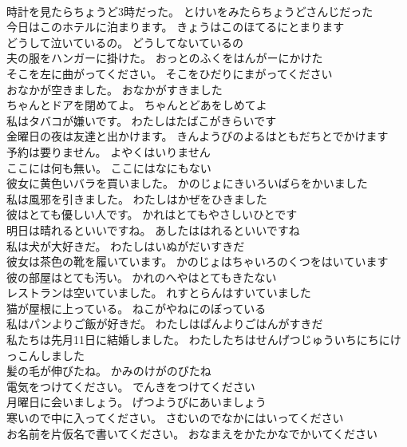 \documentclass[8pt]{extreport}
\begin{document}
\begin{CJK}{UTF8}{min}
\\	時計を見たらちょうど3時だった。	とけいをみたらちょうどさんじだった 
\\	今日はこのホテルに泊まります。	きょうはこのほてるにとまります 
\\	どうして泣いているの。	どうしてないているの 
\\	夫の服をハンガーに掛けた。	おっとのふくをはんがーにかけた 
\\	そこを左に曲がってください。	そこをひだりにまがってください 
\\	おなかが空きました。	おなかがすきました 
\\	ちゃんとドアを閉めてよ。	ちゃんとどあをしめてよ 
\\	私はタバコが嫌いです。	わたしはたばこがきらいです 
\\	金曜日の夜は友達と出かけます。	きんようびのよるはともだちとでかけます 
\\	予約は要りません。	よやくはいりません 
\\	ここには何も無い。	ここにはなにもない 
\\	彼女に黄色いバラを買いました。	かのじょにきいろいばらをかいました 
\\	私は風邪を引きました。	わたしはかぜをひきました 
\\	彼はとても優しい人です。	かれはとてもやさしいひとです 
\\	明日は晴れるといいですね。	あしたははれるといいですね 
\\	私は犬が大好きだ。	わたしはいぬがだいすきだ 
\\	彼女は茶色の靴を履いています。	かのじょはちゃいろのくつをはいています 
\\	彼の部屋はとても汚い。	かれのへやはとてもきたない 
\\	レストランは空いていました。	れすとらんはすいていました 
\\	猫が屋根に上っている。	ねこがやねにのぼっている 
\\	私はパンよりご飯が好きだ。	わたしはぱんよりごはんがすきだ 
\\	私たちは先月11日に結婚しました。	わたしたちはせんげつじゅういちにちにけっこんしました 
\\	髪の毛が伸びたね。	かみのけがのびたね 
\\	電気をつけてください。	でんきをつけてください 
\\	月曜日に会いましょう。	げつようびにあいましょう 
\\	寒いので中に入ってください。	さむいのでなかにはいってください 
\\	お名前を片仮名で書いてください。	おなまえをかたかなでかいてください 

\end{CJK}
\end{document}
